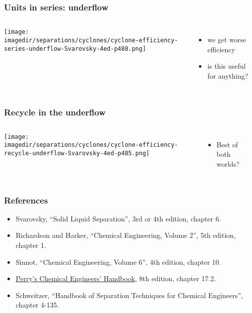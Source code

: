 \begin{frame}\frametitle{Units in series: underflow}
	\begin{columns}[t]
			\begin{center}
				\texttt{[image: \\imagedir/separations/cyclones/cyclone-efficiency-series-underflow-Svarovsky-4ed-p488.png]}
			\end{center}
		\begin{itemize}
			\item	we get worse efficiency
			\item	is this useful for anything?
		\end{itemize}
	\end{columns}
\end{frame}

\begin{frame}\frametitle{Recycle in the underflow}
	\begin{columns}[t]
			\begin{center}
				\texttt{[image: \\imagedir/separations/cyclones/cyclone-efficiency-recycle-underflow-Svarovsky-4ed-p485.png]}
			\end{center}
		\begin{itemize}
			\item	Best of both worlds?
		\end{itemize}
	\end{columns}	
\end{frame}


\begin{frame}\frametitle{References}
	\begin{itemize}
		\item	Svarovsky, ``Solid Liquid Separation'', 3rd or 4th edition, chapter 6.%
		\item	Richardson and Harker, ``Chemical Engineering, Volume 2'', 5th edition, chapter 1.
		\item	Sinnot, ``Chemical Engineering, Volume 6'', 4th edition, chapter 10.
		\item	\href{http://accessengineeringlibrary.com/browse/perrys-chemical-engineers-handbook-eighth-edition}{Perry's Chemical Engineers' Handbook}, 8th edition, chapter 17.2.
		\item	Schweitzer, ``Handbook of Separation Techniques for Chemical Engineers'', chapter 4-135.
	\end{itemize}
\end{frame}